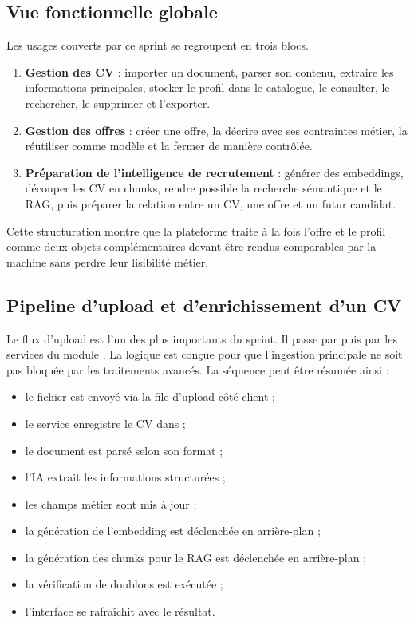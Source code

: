 \subsection{Vue fonctionnelle globale}
Les usages couverts par ce sprint se regroupent en trois blocs.
\begin{enumerate}
  \item \textbf{Gestion des CV} : importer un document, parser son contenu, extraire les informations principales, stocker le profil dans le catalogue, le consulter, le rechercher, le supprimer et l'exporter.
  \item \textbf{Gestion des offres} : créer une offre, la décrire avec ses contraintes métier, la réutiliser comme modèle et la fermer de manière contrôlée.
  \item \textbf{Préparation de l'intelligence de recrutement} : générer des embeddings, découper les CV en chunks, rendre possible la recherche sémantique et le RAG, puis préparer la relation entre un CV, une offre et un futur candidat.
\end{enumerate}

Cette structuration montre que la plateforme traite à la fois l'offre et le profil comme deux objets complémentaires devant être rendus comparables par la machine sans perdre leur lisibilité métier.

\subsection{Pipeline d'upload et d'enrichissement d'un CV}
Le flux d'upload est l'un des plus importants du sprint. Il passe par  puis par les services du module . La logique est conçue pour que l'ingestion principale ne soit pas bloquée par les traitements avancés. La séquence peut être résumée ainsi :
\begin{itemize}
  \item le fichier est envoyé via la file d'upload côté client ;
  \item le service enregistre le CV dans  ;
  \item le document est parsé selon son format ;
  \item l'IA extrait les informations structurées ;
  \item les champs métier sont mis à jour ;
  \item la génération de l'embedding est déclenchée en arrière-plan ;
  \item la génération des chunks pour le RAG est déclenchée en arrière-plan ;
  \item la vérification de doublons est exécutée ;
  \item l'interface se rafraîchit avec le résultat.
\end{itemize}

